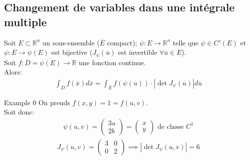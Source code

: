 \subsection{Changement de variables dans une intégrale multiple}
\begin{theoreme}

Soit $E \subset \mathbb{R}^{n}$ un sous-ensemble ($\overline{E}$ compact); $\psi: E \to \mathbb{R}^{n}$ telle que $\psi \in C'\left(E\right)$ et $\psi: E \to \psi\left(E\right)$ est bijective ($J_\psi\left(\overline{u}\right)$ est invertible $\forall \overline{u} \in E$).\\
Soit $f: \overline{D} = \overline{\psi\left(E\right)} \to \mathbb{R}$ une fonction continue.\\
Alors:
\begin{align*} \int_D f(\overline{x})d\overline{x} = \int_E f(\psi(\overline{u})) \cdot  \left|\det J_{\psi} (\overline{u})\right|d\overline{u} \end{align*}
\end{theoreme}
\begin{parag}{Example 0}
    On prends $f\left(x,y\right) = 1 =  f\left(u, v\right)$.\\
    Soit donc:
    \begin{align*} \psi (u, v) =  \begin{pmatrix} 3u \\ 2b \end{pmatrix}  = \begin{pmatrix} x \\ y \end{pmatrix} \text{ de classe } C^1 \end{align*}
    \begin{align*} J_\psi (u, v) = \begin{pmatrix} 3 & 0 \\ 0 & 2 \end{pmatrix}  \implies \left|\det J_\psi \left(u, v\right)\right|= 6 \end{align*}
    
\end{parag}
